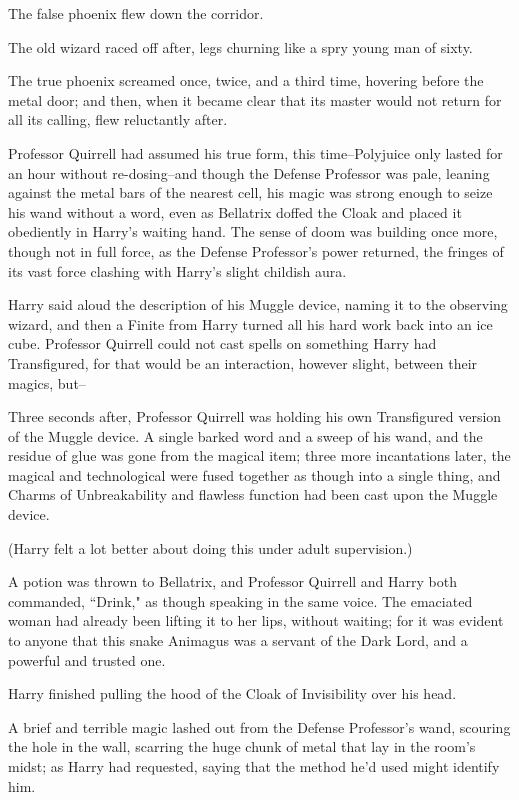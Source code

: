 The false phoenix flew down the corridor.

The old wizard raced off after, legs churning like a spry young man of sixty.

The true phoenix screamed once, twice, and a third time, hovering before the metal door; and then, when it became clear that its master would not return for all its calling, flew reluctantly after.

\later

Professor Quirrell had assumed his true form, this time\---Polyjuice only lasted for an hour without re-dosing\---and though the Defense Professor was pale, leaning against the metal bars of the nearest cell, his magic was strong enough to seize his wand without a word, even as Bellatrix doffed the Cloak and placed it obediently in Harry's waiting hand. The sense of doom was building once more, though not in full force, as the Defense Professor's power returned, the fringes of its vast force clashing with Harry's slight childish aura.

Harry said aloud the description of his Muggle device, naming it to the observing wizard, and then a Finite from Harry turned all his hard work back into an ice cube. Professor Quirrell could not cast spells on something Harry had Transfigured, for that would be an interaction, however slight, between their magics, but\---

Three seconds after, Professor Quirrell was holding his own Transfigured version of the Muggle device. A single barked word and a sweep of his wand, and the residue of glue was gone from the magical item; three more incantations later, the magical and technological were fused together as though into a single thing, and Charms of Unbreakability and flawless function had been cast upon the Muggle device.

(Harry felt a lot better about doing this under adult supervision.)

A potion was thrown to Bellatrix, and Professor Quirrell and Harry both commanded, ``Drink," as though speaking in the same voice. The emaciated woman had already been lifting it to her lips, without waiting; for it was evident to anyone that this snake Animagus was a servant of the Dark Lord, and a powerful and trusted one.

Harry finished pulling the hood of the Cloak of Invisibility over his head.

A brief and terrible magic lashed out from the Defense Professor's wand, scouring the hole in the wall, scarring the huge chunk of metal that lay in the room's midst; as Harry had requested, saying that the method he'd used might identify him.

